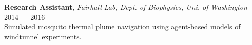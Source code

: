 \documentclass[a4paper,12pt]{article}
\newcommand{\resheading}[1]{{\vspace*{.001in} \colorbox{mygrey}{\begin{minipage}{\textwidth}{\textmd{\large \textbf{#1} \vphantom{p\^{E}}}}\end{minipage}}} }
\newcommand{\ressubheading}[4]{
    \textbf{#1} \hfill #2\\
    \textit{#3} \hfill #4 \\}
\begin{document}
{    \textbf{Research Assistant}, \textit{Fairhall Lab, Dept. of Biophysics, Uni. of Washington} \hfill 2014 --- 2016\\
    Simulated mosquito thermal plume navigation using agent-based models of windtunnel experiments.\\


    }
%
%
%
%
\end{document}
